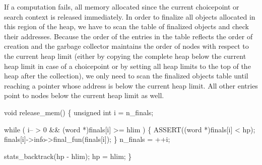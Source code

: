 \nwendcode{}\nwdocspar
If a computation fails, all memory allocated since the current
choicepoint or search context is released immediately. In order to
finalize all objects allocated in this region of the heap, we have to
scan the table of finalized objects and check their addresses. Because
the order of the entries in the table reflects the order of creation
and the garbage collector maintains the order of nodes with respect to
the current heap limit (either by copying the complete heap below the
current heap limit in case of a choicepoint or by setting all heap
limits to the top of the heap after the collection), we only need to
scan the finalized objects table until reaching a pointer whose
address is below the current heap limit. All other entries point to
nodes below the current heap limit as well.

\nwenddocs{}\plusendmoddef\nwstartdeflinemarkup{}\nwenddeflinemarkup
void
release_mem()
\{
    unsigned int i = n_finals;

    while ( i-- > 0 && (word *)finals[i] >= hlim )
    \{
        ASSERT((word *)finals[i] < hp);
        finals[i]->info->final_fun(finals[i]);
    \}
    n_finals = ++i;

    stats_backtrack(hp - hlim);
    hp = hlim;
\}
\nwendcode{}

%
%
%
%
%
%
%

